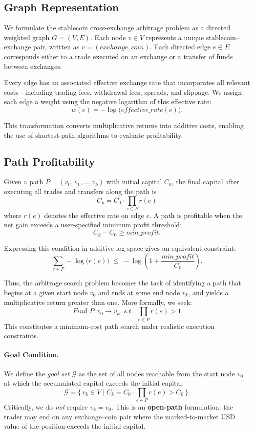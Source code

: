 \subsection{Graph Representation}

We formulate the stablecoin cross-exchange arbitrage problem as a directed weighted graph
$G=(V,E)$. Each node $v\in V$ represents a unique stablecoin--exchange pair, written as
$v=(exchange,coin)$. Each directed edge $e\in E$ corresponds either to a trade executed on an
exchange or a transfer of funds between exchanges. 

Every edge has an associated effective exchange rate that incorporates all relevant costs---including trading fees, withdrawal fees, spreads, and slippage. We assign each edge a weight using the negative logarithm of this effective rate:
\[
w(e) = -\log\!\big(\textit{effective\_rate}(e)\big).
\] %

This transformation converts multiplicative returns into additive costs, enabling the use of shortest-path algorithms to evaluate profitability.

\subsection{Path Profitability}

Given a path $P=(v_0,v_1,\dots,v_k)$ with initial capital $C_0$, the final capital after executing all trades and transfers along the path is
\[
C_k = C_0 \cdot \prod_{e\in P} r(e)
\]
where $r(e)$ denotes the effective rate on edge $e$. A path is profitable when the net gain exceeds a user-specified minimum profit threshold:
\[
C_k - C_0 \ge \textit{min\_profit}.
\] %

Expressing this condition in additive log space gives an equivalent constraint:
\[
\sum_{e\in P} -\log\!\big(r(e)\big)
\;\le\;
-\log\!\left(1+\frac{\textit{min\_profit}}{C_0}\right).
\]

Thus, the arbitrage search problem becomes the task of identifying a path that begins at a given start node $v_0$ and ends at some end node $v_k$, and yields a multiplicative return greater than one. More formally, we seek:
\[
\textit{Find } P: v_0 \to v_k \;\; \textit{s.t.}\;\; \prod_{e\in P} r(e) > 1
\]
This constitutes a minimum-cost path search under realistic execution constraints.

\paragraph{Goal Condition.}
We define the \emph{goal set} $\mathcal{G}$ as the set of all nodes reachable from the start node $v_0$ at which the accumulated capital exceeds the initial capital:
\[
\mathcal{G} = \bigl\{\, v_k \in V \;\big|\; C_k = C_0 \cdot \textstyle\prod_{e \in P} r(e) > C_0 \,\bigr\}.
\]
Critically, we do \emph{not} require $v_k = v_0$. This is an \textbf{open-path} formulation: the trader may end on any exchange--coin pair where the marked-to-market USD value of the position exceeds the initial capital.

